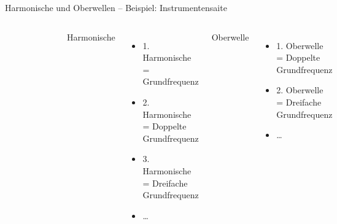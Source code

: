 \begin{frame}{Harmonische und Oberwellen -- Beispiel: Instrumentensaite}
  \begin{columns}[c]
    \begin{figure}
      \includegraphics[width=\textwidth,height=\textheight,keepaspectratio]{a11/512px-Moodswingerscale.png}
    \end{figure}
    Harmonische
    \begin{itemize}
      \item 1. Harmonische = Grundfrequenz
      \item 2. Harmonische = Doppelte Grundfrequenz
      \item 3. Harmonische = Dreifache Grundfrequenz
      \item \ldots
    \end{itemize}
    Oberwelle
    \begin{itemize}
      \item 1. Oberwelle = Doppelte Grundfrequenz
      \item 2. Oberwelle = Dreifache Grundfrequenz
      \item \ldots
    \end{itemize}
  \end{columns}
\end{frame}

